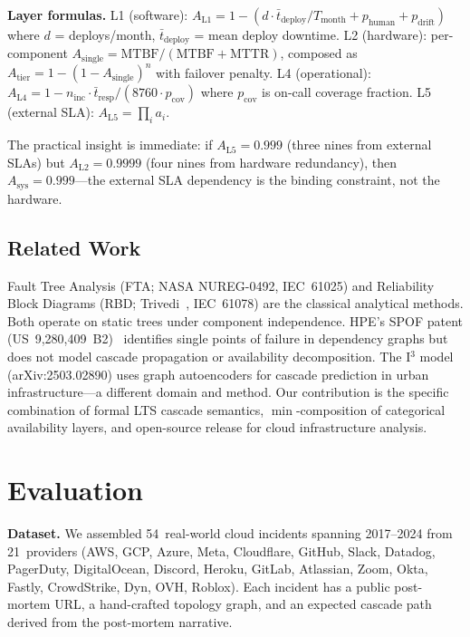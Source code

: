 \documentclass[conference,10pt]{IEEEtran}
\begin{document}
\textbf{Layer formulas.}
L1 (software): $A_{\text{L1}} = 1 - (d \cdot \bar{t}_{\text{deploy}}
/ T_{\text{month}} + p_{\text{human}} + p_{\text{drift}})$
where $d$ = deploys/month, $\bar{t}_{\text{deploy}}$ = mean deploy
downtime. L2 (hardware): per-component
$A_{\text{single}} = \text{MTBF}/(\text{MTBF}+\text{MTTR})$,
composed as $A_{\text{tier}} = 1 - (1-A_{\text{single}})^n$
with failover penalty. L4 (operational):
$A_{\text{L4}} = 1 - n_{\text{inc}} \cdot \bar{t}_{\text{resp}}
/ (8760 \cdot p_{\text{cov}})$ where $p_{\text{cov}}$ is on-call
coverage fraction. L5 (external SLA): $A_{\text{L5}} = \prod_i a_i$.

The practical insight is immediate: if
$A_{\text{L5}} = 0.999$ (three nines from external SLAs) but
$A_{\text{L2}} = 0.9999$ (four nines from hardware redundancy),
then $A_{\text{sys}} = 0.999$---the external SLA dependency
is the binding constraint, not the hardware.

\subsection{Related Work}

Fault Tree Analysis (FTA; NASA NUREG-0492, IEC~61025) and Reliability
Block Diagrams (RBD; Trivedi~\cite{trivedi2001}, IEC~61078) are
the classical analytical methods. Both operate on static trees
under component independence. HPE's SPOF patent
(US~9,280,409~B2)~\cite{hpe-spof} identifies single points of
failure in dependency graphs but does not model cascade propagation
or availability decomposition. The I$^3$ model (arXiv:2503.02890)
uses graph autoencoders for cascade prediction in urban
infrastructure---a different domain and method. Our contribution
is the specific combination of formal LTS cascade semantics,
$\min$-composition of categorical availability layers, and
open-source release for cloud infrastructure analysis.

\section{Evaluation}\label{sec:eval}

\textbf{Dataset.} We assembled 54~real-world cloud incidents spanning
2017--2024 from 21~providers (AWS, GCP, Azure, Meta, Cloudflare,
GitHub, Slack, Datadog, PagerDuty, DigitalOcean, Discord, Heroku,
GitLab, Atlassian, Zoom, Okta, Fastly, CrowdStrike, Dyn, OVH,
Roblox). Each incident has a
public post-mortem URL, a hand-crafted topology graph, and an
expected cascade path derived from the post-mortem narrative.
\end{document}
